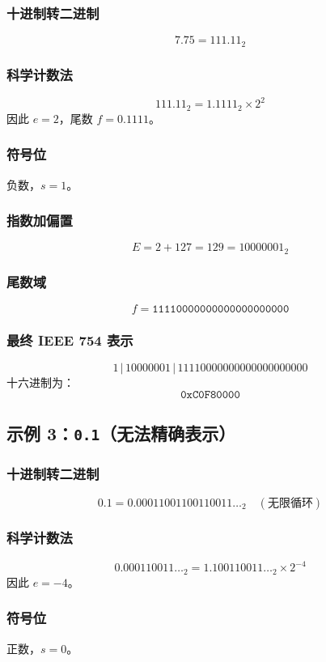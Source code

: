 \subsubsection*{十进制转二进制}
\[
7.75 = 111.11_2
\]

\subsubsection*{科学计数法}
\[
111.11_2 = 1.1111_2 \times 2^2
\]
因此 $e=2$，尾数 $f=0.1111$。

\subsubsection*{符号位}
负数，$s=1$。

\subsubsection*{指数加偏置}
\[
E = 2+127 = 129 = 10000001_2
\]

\subsubsection*{尾数域}
\[
f = \texttt{11110000000000000000000}
\]

\subsubsection*{最终 IEEE 754 表示}
\[
1 \,|\, 10000001 \,|\, 11110000000000000000000
\]
十六进制为：
\[
\texttt{0xC0F80000}
\]

\subsection{示例 3：\texttt{0.1}（无法精确表示）}

\subsubsection*{十进制转二进制}
\[
0.1 = 0.00011001100110011\ldots_2 \quad (\text{无限循环})
\]

\subsubsection*{科学计数法}
\[
0.000110011\ldots_2 = 1.100110011\ldots_2 \times 2^{-4}
\]
因此 $e=-4$。

\subsubsection*{符号位}
正数，$s=0$。

